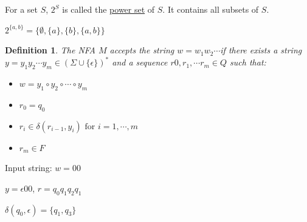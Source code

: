 \documentclass[twoside]{article}
\newtheorem{definition}[theorem]{Definition}
\begin{document}
For a set $S$, $2^S$ is called the \underline{power set} of $S$. It contains all subsets of $S$.

$2^{\{a, b\}} = \{\emptyset, \{a\}, \{b\}, \{a, b\}\}$

\begin{definition}
  The NFA $M$ accepts the string  $w = w_1w_2 \cdots$if there exists a string $y = y_1y_2 \cdots y_m \in (\Sigma \cup \{\epsilon\})^*$  and a sequence $r0, r_1, \cdots r_m \in Q$ such that:
  \begin{itemize}
    \item $w = y_1 \circ y_2 \circ \cdots \circ y_m$
    \item $r_0 = q_0$
    \item $r_i \in \delta (r_{i-1}, y_i) \text{ for } i = 1, \cdots, m$
    \item $r_m \in F$
  \end{itemize}
\end{definition}

Input string: $w = 00$

$y = \epsilon 00$, $r = q_0q_1q_2q_1$

$\delta(q_0, \epsilon) = \{q_1, q_3\}$
\end{document}
